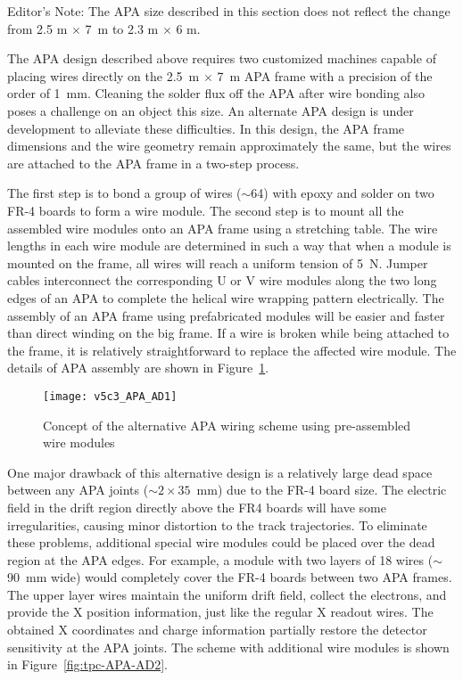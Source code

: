 \begin{editornote}
  Editor's Note:  The APA size described in this section does not reflect the change from 2.5 m $\times$ 7~m  to 2.3 m $\times$ 6 m.
\end{editornote}

The APA design described above requires two customized machines capable of placing wires directly on the 2.5~m $\times$ 7~m APA frame with a precision of the order of 1~mm.  Cleaning the solder flux off the APA after wire bonding also poses a challenge on an object this size. An alternate APA design is under development to alleviate these difficulties.  In this design, the APA frame dimensions and the wire geometry remain  approximately the same, but the wires are attached to the APA frame in a two-step process.

The first step is to bond a group of wires ($\sim$64) with epoxy and solder on two FR-4 boards to form a wire module.   The second step is to mount all the assembled wire modules onto an APA frame using a stretching table.  The wire lengths in each wire module are determined in such a way that when a module is mounted on the frame, all wires will reach a uniform tension of 5~N.  Jumper cables interconnect the corresponding U or V wire modules along the two long edges of an APA to complete the helical wire wrapping pattern electrically.
The assembly of an APA frame  using prefabricated modules will be easier and faster than direct winding on the big frame.  If a wire is broken while being attached to the frame, it is relatively straightforward to replace the affected wire module. The details of APA assembly are shown in Figure~\ref{fig:tpc-APA-AD1}.  
 
\begin{figure}[htpb]
\centering
\texttt{[image: v5c3\_APA\_AD1]}
\caption[Concept of the alternative APA wiring scheme]{Concept of the alternative APA wiring scheme using pre-assembled wire modules}
\label{fig:tpc-APA-AD1}
\end{figure}

One major drawback of this alternative design is a relatively large dead space between any APA joints ($\sim 2 \times 35$~mm) due to the FR-4 board size.  The electric field in the drift region directly above the FR4 boards will have some irregularities, causing minor distortion to the track trajectories. To eliminate these problems, additional special wire modules could be placed over the dead region at the APA edges. For example, a module with two layers of 18 wires ($\sim$90~mm wide) would completely cover the FR-4 boards between two APA frames. The upper layer wires maintain the uniform drift field, collect the electrons, and provide the X position information, just like the regular X readout wires. The obtained X coordinates and charge information partially restore the detector sensitivity at the APA joints. The scheme with additional wire modules is shown in Figure~\ref{fig:tpc-APA-AD2}. 
                   
